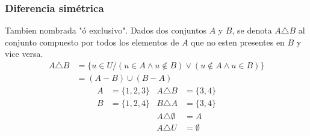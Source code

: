 \documentclass[../teoria.root.tex]{subfiles}
\begin{document}
\subsubsection{Diferencia simétrica}
Tambien nombrada "ó exclusivo". Dados dos conjuntos $A$ y $B$, se denota $A \triangle B$
al conjunto compuesto por todos los elementos de $A$ que no esten presentes en $B$ y vice versa.
\begin{align*}
    A \triangle B & = \{u \in U / (u \in A \land u \notin B) \lor (u \notin A \land u \in B) \} \\
                  & = (A - B) \cup (B - A)
\end{align*}
\begin{align*}
    A & = \{1, 2, 3\} & A \triangle B         & = \{3, 4\}  \\
    B & = \{1, 2, 4\} & B \triangle A         & = \{3, 4\}  \\
      &               & A \triangle \emptyset & = A         \\
      &               & A \triangle U         & = \emptyset
\end{align*}
\end{document}
